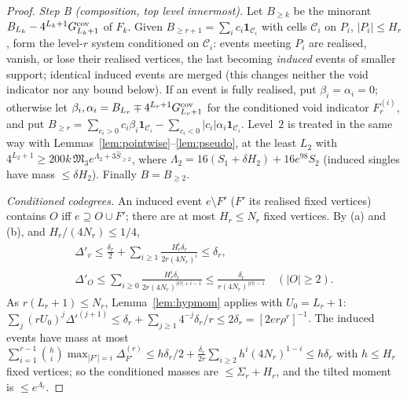 \documentclass[11pt,reqno]{amsart}
\theoremstyle{definition}
\begin{document}
\begin{proof}
\emph{Step B (composition, top level innermost).}  Let $B_{\ge k}$ be the
minorant $B_{L_k}-4^{L_k+1}G^{\rm cov}_{L_k+1}$ of $F_k$.  Given
$B_{\ge r+1}=\sum_ic_i\mathbf 1_{\mathcal C_i}$ with cells $\mathcal C_i$ on $P_i$,
$|P_i|\le H_r$, form the level-$r$ system conditioned on $\mathcal C_i$: events
meeting $P_i$ are realised, vanish, or lose their realised vertices, the last
becoming \emph{induced} events of smaller support; identical induced events are
merged (this changes neither the void indicator nor any bound below).  If an
event is fully realised, put $\beta_i=\alpha_i=0$; otherwise let
$\beta_i,\alpha_i=B_{L_r}\mp4^{L_r+1}G^{\rm cov}_{L_r+1}$ for the conditioned void
indicator $F_r^{(i)}$, and put
$B_{\ge r}=\sum_{c_i>0}c_i\beta_i\mathbf 1_{\mathcal C_i}-\sum_{c_i<0}|c_i|\alpha_i\mathbf 1_{\mathcal C_i}$.
Level~$2$ is treated in the same way with
Lemmas~\ref{lem:pointwise}--\ref{lem:pseudo}, at the least $L_2$ with
$4^{L_2+1}\ge200k\,\mathfrak M_3e^{\Lambda_2+3\hat S_{\ge2}}$, where
$\Lambda_2=16(S_1+\delta H_2)+16e^{98}S_2$ (induced singles have mass
$\le\delta H_2$).  Finally $B=B_{\ge2}$.

\emph{Conditioned codegrees.}  An induced event $e\setminus F'$ ($F'$ its realised
fixed vertices) contains $O$ iff $e\supseteq O\cup F'$; there are at most
$H_r\le N_r$ fixed vertices.  By (a) and (b), and $H_r/(4N_r)\le1/4$,
\begin{gather*}
 \Delta'_v\le\frac{\delta_r}2+\sum_{i\ge1}\frac{H_r^i\delta_r}{2r(4N_r)^i}\le\delta_r,\\
 \Delta'_O\le\sum_{i\ge0}\frac{H_r^i\delta_r}{2r(4N_r)^{|O|+i-1}}\le\frac{\delta_r}{r(4N_r)^{|O|-1}}\quad(|O|\ge2).
\end{gather*}
As $r(L_r+1)\le N_r$, Lemma~\ref{lem:hypmom} applies with $U_0=L_r+1$:
$\sum_j(rU_0)^j\Delta'^{(j+1)}\le\delta_r+\sum_{j\ge1}4^{-j}\delta_r/r\le2\delta_r=[2er\rho^r]^{-1}$.
The induced events have mass at most
$\sum_{i=1}^{r-1}\binom hi\max_{|F'|=i}\Delta^{(r)}_{F'}\le h\delta_r/2+\frac{\delta_r}{2r}\sum_{i\ge2}h^i(4N_r)^{1-i}\le h\delta_r$
with $h\le H_r$ fixed vertices; so the conditioned masses are $\le\Sigma_r+H_r$,
and the tilted moment is $\le e^{\Lambda_r}$.


\end{proof}
\end{document}
